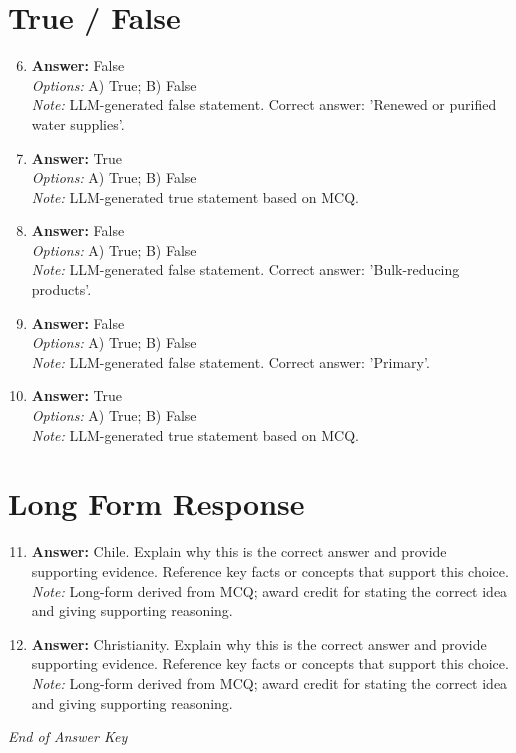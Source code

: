 \documentclass[12pt]{article}
\begin{document}
\section*{True / False}
\begin{enumerate}[label=\arabic*.]
\setcounter{enumi}{5}
\item \textbf{Answer:} False
\\ \textit{Options:} A) True; B) False
\\ \textit{Note:} LLM-generated false statement. Correct answer: 'Renewed or purified water supplies'.
\item \textbf{Answer:} True
\\ \textit{Options:} A) True; B) False
\\ \textit{Note:} LLM-generated true statement based on MCQ.
\item \textbf{Answer:} False
\\ \textit{Options:} A) True; B) False
\\ \textit{Note:} LLM-generated false statement. Correct answer: 'Bulk-reducing products'.
\item \textbf{Answer:} False
\\ \textit{Options:} A) True; B) False
\\ \textit{Note:} LLM-generated false statement. Correct answer: 'Primary'.
\item \textbf{Answer:} True
\\ \textit{Options:} A) True; B) False
\\ \textit{Note:} LLM-generated true statement based on MCQ.
\end{enumerate}

\section*{Long Form Response}
\begin{enumerate}[label=\arabic*.]
\setcounter{enumi}{10}
\item \textbf{Answer:} Chile. Explain why this is the correct answer and provide supporting evidence. Reference key facts or concepts that support this choice.
\\ \textit{Note:} Long-form derived from MCQ; award credit for stating the correct idea and giving supporting reasoning.
\item \textbf{Answer:} Christianity. Explain why this is the correct answer and provide supporting evidence. Reference key facts or concepts that support this choice.
\\ \textit{Note:} Long-form derived from MCQ; award credit for stating the correct idea and giving supporting reasoning.
\end{enumerate}

\vfill
\noindent\textit{End of Answer Key}
\end{document}
